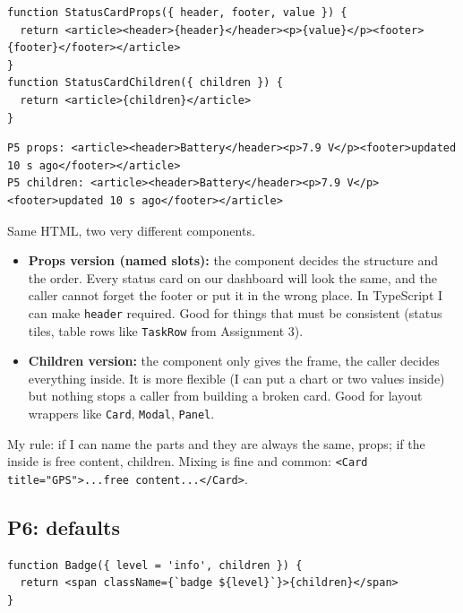 \begin{lstlisting}
function StatusCardProps({ header, footer, value }) {
  return <article><header>{header}</header><p>{value}</p><footer>{footer}</footer></article>
}
function StatusCardChildren({ children }) {
  return <article>{children}</article>
}
\end{lstlisting}

\begin{lstlisting}
P5 props: <article><header>Battery</header><p>7.9 V</p><footer>updated 10 s ago</footer></article>
P5 children: <article><header>Battery</header><p>7.9 V</p><footer>updated 10 s ago</footer></article>
\end{lstlisting}

Same HTML, two very different components.

\begin{itemize}
\tightlist
\item
  \textbf{Props version (named slots):} the component decides the structure and the order. Every status card on our dashboard will look the same, and the caller cannot forget the footer or put it in the wrong place. In TypeScript I can make \passthrough{\lstinline!header!} required. Good for things that must be consistent (status tiles, table rows like \passthrough{\lstinline!TaskRow!} from Assignment 3).
\item
  \textbf{Children version:} the component only gives the frame, the caller decides everything inside. It is more flexible (I can put a chart or two values inside) but nothing stops a caller from building a broken card. Good for layout wrappers like \passthrough{\lstinline!Card!}, \passthrough{\lstinline!Modal!}, \passthrough{\lstinline!Panel!}.
\end{itemize}

My rule: if I can name the parts and they are always the same, props; if the inside is free content, children. Mixing is fine and common: \passthrough{\lstinline!<Card title="GPS">...free content...</Card>!}.

\hypertarget{p6-defaults}{%
\subsection{P6: defaults}\label{p6-defaults}}

\begin{lstlisting}
function Badge({ level = 'info', children }) {
  return <span className={`badge ${level}`}>{children}</span>
}
\end{lstlisting}

